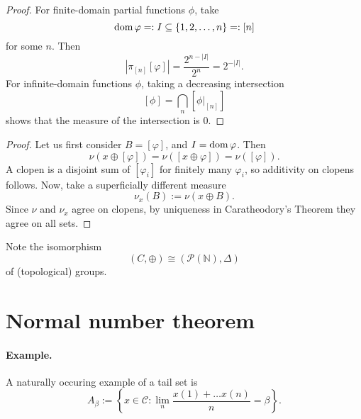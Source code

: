 \begin{proof}
For finite-domain partial functions \( \phi \), take
\[ 
    \operatorname{dom}\varphi =: I \subseteq \left\{ 1, 2, \ldots, n \right\} =: [n]
\]
for some \( n \). Then
\[ 
    \left| \pi_{[n]}[ \varphi ] \right| = \frac{2^{n - |I|}}{2^n} = 2^{-|I|}.
\]
For infinite-domain functions \( \phi \), taking a decreasing intersection
\[ 
    \left[ \phi \right] = \bigcap_n \left[ \phi |_{[n]} \right]
\]
shows that the measure of the intersection is \( 0 \).
\end{proof}
\begin{proof}
    Let us first consider \( B = \left [ \varphi \right ] \), and \( I = \operatorname{dom} \varphi \). Then
    \[ 
       \nu \left( x \oplus \left[ \varphi \right] \right) = \nu \left( \left[ x \oplus \varphi \right] \right) = \nu \left( \left[ \varphi \right] \right).
   \]
   A clopen is a disjoint sum of \( \left[ \varphi_i \right] \) for finitely many \( \varphi_i \), so additivity on clopens follows. Now, take a superficially different measure
   \[ 
      \nu_x(B) := \nu \left( x \oplus B \right). 
  \]
  Since \( \nu \) and \( \nu_x \) agree on clopens, by uniqueness in Caratheodory's Theorem they agree on all sets.
\end{proof}

Note the isomorphism
\[ 
    (C, \oplus) \cong ( \mathcal{P}( \mathbb{N} ), \Delta ) 
\]
of (topological) groups.

\section{Normal number theorem}


\paragraph{Example.} A naturally occuring example of a tail set is
\[ 
    A_\beta := \left\{ x \in \mathcal{C} : \lim_n \frac{x(1) + \ldots x(n)}{n}= \beta \right\}.
\]

